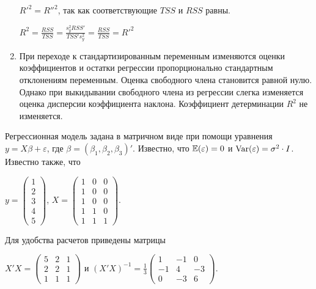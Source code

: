 \begin{problem}
\begin{sol}
\begin{enumerate}
$R'^2=R''^2$, так как соответствующие $TSS$ и $RSS$ равны.

$R^2=\frac{RSS}{TSS}=\frac{s_y^2RSS'}{TSS's_y^2}=\frac{RSS}{TSS}=R'^2$

\item При переходе к стандартизированным переменным изменяются оценки коэффициентов и остатки регрессии пропорционально стандартным отклонениям переменным.
Оценка свободного члена становится равной нулю.
Однако при выкидывании свободного члена из регрессии слегка изменяется оценка дисперсии коэффициента наклона.
Коэффициент детерминации $R^2$ не изменяется.


\end{enumerate}
\end{sol}
\end{problem}


\begin{problem}
Регрессионная модель задана в матричном виде при помощи уравнения $y = X\beta + \varepsilon$, где $\beta=(\beta_1, \beta_2, \beta_3)'$.
Известно, что $\mathbb{E}(\varepsilon) = 0$ и $\operatorname{Var}(\varepsilon)=\sigma^2\cdot I$.
Известно также, что


$y=\left(
\begin{array}{c}
1\\
2\\
3\\
4\\
5
\end{array}\right)$,
$X=\left(\begin{array}{ccc}
1 & 0 & 0 \\
1 & 0 & 0 \\
1 & 0 & 0 \\
1 & 1 & 0 \\
1 & 1 & 1
\end{array}\right)$.


Для удобства расчетов приведены матрицы


$X'X=\left(
\begin{array}{ccc}
5 & 2 & 1\\
2 & 2 & 1\\
1 & 1 & 1
\end{array}\right)$ и $(X'X)^{-1}=\frac{1}{3}\left(
\begin{array}{ccc}
1 & -1 & 0 \\
-1 & 4 & -3 \\
0 & -3 & 6
\end{array}\right)$.


\end{problem}
